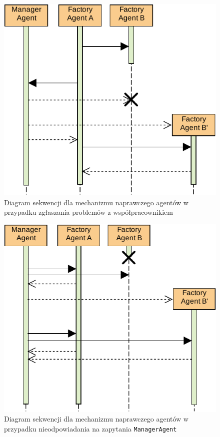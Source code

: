 \begin{figure}[h]
	\centering
	\includegraphics[width=0.8\columnwidth]{figures/SAG-Kablowanie.pdf}
	\caption{Diagram sekwencji dla mechanizmu naprawczego agentów w przypadku zgłaszania problemów z współpracownikiem}
	\label{fig:recovery-kablowanie}
\end{figure}

\begin{figure}[h]
	\centering
	\includegraphics[width=0.8\columnwidth]{figures/SAG-Pingowanie.pdf}
	\caption{Diagram sekwencji dla mechanizmu naprawczego agentów w przypadku nieodpowiadania na zapytania \texttt{ManagerAgent}}
	\label{fig:recovery-pingowanie}
\end{figure}




